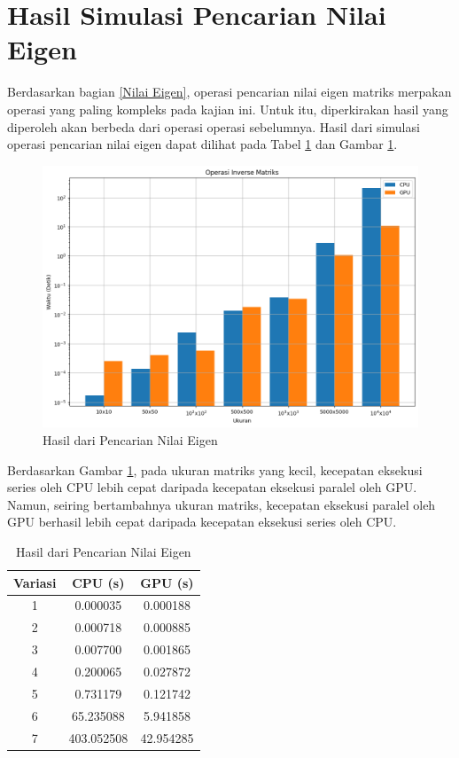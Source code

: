 \section{Hasil Simulasi Pencarian Nilai Eigen}

Berdasarkan bagian \ref{Nilai Eigen}, operasi pencarian nilai eigen matriks merpakan operasi yang paling kompleks pada kajian ini. Untuk itu, diperkirakan hasil yang diperoleh akan berbeda dari operasi operasi sebelumnya. Hasil dari simulasi operasi pencarian nilai eigen dapat dilihat pada Tabel \ref{tab:result_eigenvalue} dan Gambar \ref{img:result_eigenvalue}.

\begin{figure}[H]
	\centering
	\includegraphics[width=14cm, scale=1]{images/penelitian/eigenvalue.png}
	\caption{Hasil dari Pencarian Nilai Eigen}
	\label{img:result_eigenvalue}
\end{figure}

Berdasarkan Gambar \ref{img:result_eigenvalue}, pada ukuran matriks yang kecil, kecepatan eksekusi series oleh CPU lebih cepat daripada kecepatan eksekusi paralel oleh GPU. Namun, seiring bertambahnya ukuran matriks, kecepatan eksekusi paralel oleh GPU berhasil lebih cepat daripada kecepatan eksekusi series oleh CPU.

\begin{table}[H]
	\centering
	\caption{Hasil dari Pencarian Nilai Eigen}
	\label{tab:result_eigenvalue}
	\begin{tabular}{ccc}
		\toprule
		Variasi & CPU (s)    & GPU (s)   \\
		\midrule
		1       & 0.000035   & 0.000188  \\
		2       & 0.000718   & 0.000885  \\
		3       & 0.007700   & 0.001865  \\
		4       & 0.200065   & 0.027872  \\
		5       & 0.731179   & 0.121742  \\
		6       & 65.235088  & 5.941858  \\
		7       & 403.052508 & 42.954285 \\
		\bottomrule
	\end{tabular}
\end{table}

